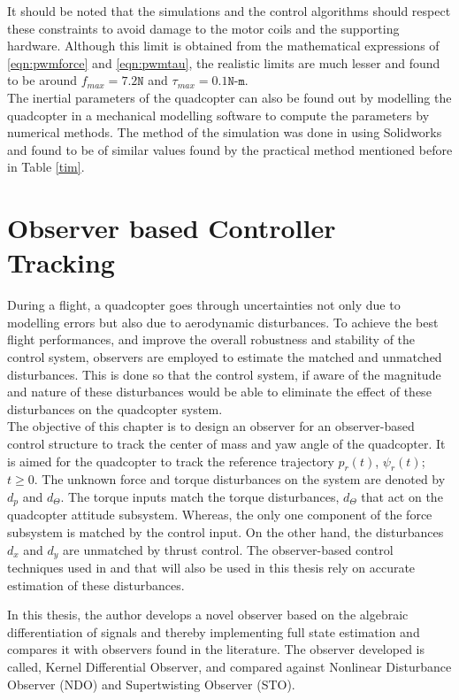 \documentclass[letterpaper%
, twoside%
, 12pt%
,memoire%
, english%
,creativecommons,hyperref%
]{thETS}
\begin{document}
It should be noted that the simulations and the control algorithms should respect these constraints to avoid damage to the motor coils and the supporting hardware. Although this limit is obtained from the mathematical expressions of \eqref{eqn:pwmforce} and \eqref{eqn:pwmtau}, the realistic limits are much lesser and found to be around $f_{max}=7.2\texttt{N}$ and $\tau_{max}=0.1\texttt{N-m}$.\\ 
The inertial parameters of the quadcopter can also be found out by modelling the quadcopter in a mechanical modelling software to compute the parameters by numerical methods. The method of the simulation was done in \citep{RN114} using Solidworks and found to be of similar values found by the practical method mentioned before in Table \ref{tim}.

\chapter{Observer based Controller Tracking} \label{Chap:Observers}
During a flight, a quadcopter goes through uncertainties not only due to modelling errors but also due to aerodynamic disturbances. To achieve the best flight performances, and improve the overall robustness and stability of the control system, observers are employed to estimate the matched and unmatched disturbances. This is done so that the control system, if aware of the magnitude and nature of these disturbances would be able to eliminate the effect of these disturbances on the quadcopter system.  \\
The objective of this chapter is to design an observer for an observer-based control structure to track the center of mass and yaw angle of the quadcopter. It is aimed for the quadcopter to track the reference trajectory $p_r(t)$, $\psi_r(t)$; $t\geq 0$. The unknown force and torque disturbances on the system are denoted by $d_p$ and $d_\Theta$. The torque inputs match the torque disturbances, $d_\Theta$ that act on the quadcopter attitude subsystem. Whereas, the only one component of the force subsystem is matched by the control input. On the other hand, the disturbances $d_x$ and $d_y$ are unmatched by thrust control. The observer-based control techniques used in \citep{RN114} and \citep{RN117} that will also be used in this thesis rely on accurate estimation of these disturbances. 

In this thesis, the author develops a novel observer based on the algebraic differentiation of signals and thereby implementing full state estimation and compares it with observers found in the literature. The observer developed is called, Kernel Differential Observer, and compared against Nonlinear Disturbance Observer (NDO) and Supertwisting Observer (STO).
\end{document}
